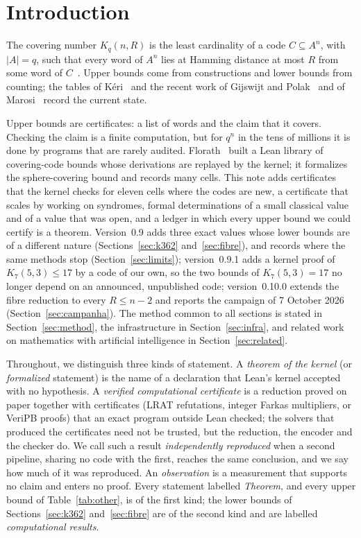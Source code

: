 \documentclass[11pt]{amsart}
\theoremstyle{definition}
\theoremstyle{remark}
\begin{document}
\maketitle

\section{Introduction}
The covering number $K_q(n,R)$ is the least cardinality of a code $C\subseteq A^n$, with $|A|=q$, such that every word of $A^n$ lies at Hamming distance at most $R$ from some word of $C$~\cite{cohen1997}.
Upper bounds come from constructions and lower bounds from counting; the tables of Kéri~\cite{keri} and the recent work of Gijswijt and Polak~\cite{gp2025} and of Marosi~\cite{marosi2026} record the current state.

Upper bounds are certificates: a list of words and the claim that it covers.
Checking the claim is a finite computation, but for $q^n$ in the tens of millions it is done by programs that are rarely audited.
Florath~\cite{florath2026} built a Lean library of covering-code bounds whose derivations are replayed by the kernel; it formalizes the sphere-covering bound and records many cells.
This note adds certificates that the kernel checks for eleven cells where the codes are new, a certificate that scales by working on syndromes, formal determinations of a small classical value and of a value that was open, and a ledger in which every upper bound we could certify is a theorem.
Version~0.9 adds three exact values whose lower bounds are of a different nature (Sections~\ref{sec:k362} and~\ref{sec:fibre}), and records where the same methods stop (Section~\ref{sec:limits}); version~0.9.1 adds a kernel proof of $K_7(5,3)\le 17$ by a code of our own, so the two bounds of $K_7(5,3)=17$ no longer depend on an announced, unpublished code; version~0.10.0 extends the fibre reduction to every $R\le n-2$ and reports the campaign of 7 October 2026 (Section~\ref{sec:campanha}).
The method common to all sections is stated in Section~\ref{sec:method}, the infrastructure in Section~\ref{sec:infra}, and related work on mathematics with artificial intelligence in Section~\ref{sec:related}.

Throughout, we distinguish three kinds of statement.
A \emph{theorem of the kernel} (or \emph{formalized} statement) is the name of a declaration that Lean's kernel accepted with no hypothesis.
A \emph{verified computational certificate} is a reduction proved on paper together with certificates (LRAT refutations, integer Farkas multipliers, or VeriPB proofs) that an exact program outside Lean checked; the solvers that produced the certificates need not be trusted, but the reduction, the encoder and the checker do.
We call such a result \emph{independently reproduced} when a second pipeline, sharing no code with the first, reaches the same conclusion, and we say how much of it was reproduced.
An \emph{observation} is a measurement that supports no claim and enters no proof.
Every statement labelled \emph{Theorem}, and every upper bound of Table~\ref{tab:other}, is of the first kind; the lower bounds of Sections~\ref{sec:k362} and~\ref{sec:fibre} are of the second kind and are labelled \emph{computational results}.
\end{document}
